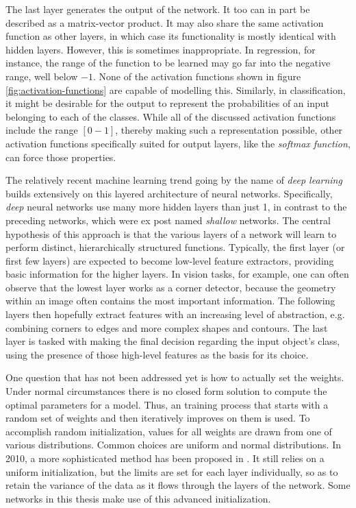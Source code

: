 \documentclass[11pt, a4paper]{article}
\begin{document}
The last layer generates the output of the network. It too can in part be described as a matrix-vector product. It may also share the same activation function as other layers, in which case its functionality is mostly identical with hidden layers. However, this is sometimes inappropriate. In regression, for instance, the range of the function to be learned may go far into the negative range, well below $-1$. None of the activation functions shown in figure \ref{fig:activation-functions} are capable of modelling this. Similarly, in classification, it might be desirable for the output to represent the probabilities of an input belonging to each of the classes. While all of the discussed activation functions include the range $[0-1]$, thereby making such a representation possible, other activation functions specifically suited for output layers, like the \emph{softmax function}, can force those properties.

The relatively recent machine learning trend going by the name of \emph{deep learning} builds extensively on this layered architecture of neural networks. Specifically, \emph{deep} neural networks use many more hidden layers than just 1, in contrast to the preceding networks, which were ex post named \emph{shallow} networks. The central hypothesis of this approach is that the various layers of a network will learn to perform distinct, hierarchically structured functions. Typically, the first layer (or first few layers) are expected to become low-level feature extractors, providing basic information for the higher layers. In vision tasks, for example, one can often observe that the lowest layer works as a corner detector, because the geometry within an image often contains the most important information. The following layers then hopefully extract features with an increasing level of abstraction, e.g. combining corners to edges and more complex shapes and contours. The last layer is tasked with making the final decision regarding the input object's class, using the presence of those high-level features as the basis for its choice.

One question that has not been addressed yet is how to actually set the weights. Under normal circumstances there is no closed form solution to compute the optimal parameters for a model. Thus, an training process that starts with a random set of weights and then iteratively improves on them is used. To accomplish random initialization, values for all weights are drawn from one of various distributions. Common choices are uniform and normal distributions. In 2010, a more sophisticated method has been proposed in \cite{glorot-understanding-deep-nn-training}. It still relies on a uniform initialization, but the limits are set for each layer individually, so as to retain the variance of the data as it flows through the layers of the network. Some networks in this thesis make use of this advanced initialization.
\end{document}
